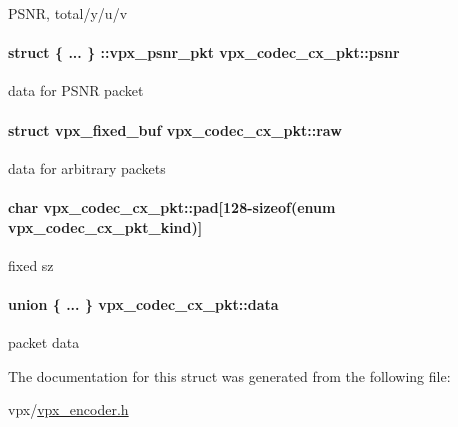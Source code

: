 P\+S\+N\+R, total/y/u/v \hypertarget{structvpx__codec__cx__pkt_ac91dc0ee23d3d939b85eb82eb5ccc042}{
\paragraph[{psnr}]{\setlength{\rightskip}{0pt plus 5cm}struct \{ ... \} \+::vpx\+\_\+psnr\+\_\+pkt  vpx\+\_\+codec\+\_\+cx\+\_\+pkt\+::psnr}}\label{structvpx__codec__cx__pkt_ac91dc0ee23d3d939b85eb82eb5ccc042}
data for P\+S\+N\+R packet \hypertarget{structvpx__codec__cx__pkt_acc7ee91ea9c907aea7c3b953324f7c26}{
\paragraph[{raw}]{\setlength{\rightskip}{0pt plus 5cm}struct {\bf vpx\+\_\+fixed\+\_\+buf} vpx\+\_\+codec\+\_\+cx\+\_\+pkt\+::raw}}\label{structvpx__codec__cx__pkt_acc7ee91ea9c907aea7c3b953324f7c26}
data for arbitrary packets \hypertarget{structvpx__codec__cx__pkt_a49a0ba012fdabd49bff8069dfacf6ced}{
\paragraph[{pad}]{\setlength{\rightskip}{0pt plus 5cm}char vpx\+\_\+codec\+\_\+cx\+\_\+pkt\+::pad\mbox{[}128-\/sizeof(enum {\bf vpx\+\_\+codec\+\_\+cx\+\_\+pkt\+\_\+kind})\mbox{]}}}\label{structvpx__codec__cx__pkt_a49a0ba012fdabd49bff8069dfacf6ced}
fixed sz \hypertarget{structvpx__codec__cx__pkt_a7f97b060a23b7e89fe5b885c0074f696}{
\paragraph[{data}]{\setlength{\rightskip}{0pt plus 5cm}union \{ ... \}   vpx\+\_\+codec\+\_\+cx\+\_\+pkt\+::data}}\label{structvpx__codec__cx__pkt_a7f97b060a23b7e89fe5b885c0074f696}
packet data 

The documentation for this struct was generated from the following file\+:\begin{DoxyCompactItemize}
\item 
vpx/\hyperlink{vpx__encoder_8h}{vpx\+\_\+encoder.\+h}\end{DoxyCompactItemize}
